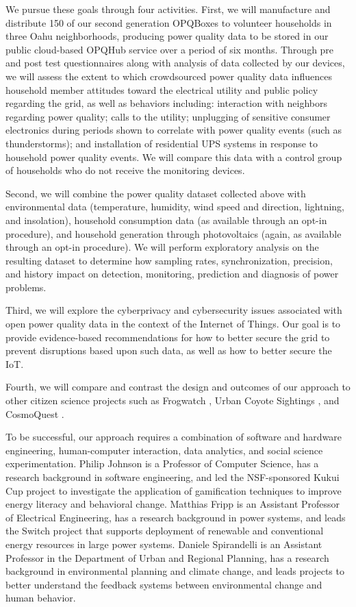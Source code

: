 We pursue these goals through four activities. First, we will manufacture and distribute 150 of our second generation OPQBoxes to volunteer households in three Oahu neighborhoods, producing power quality data to be stored in our public cloud-based OPQHub service over a period of six months. Through pre and post test questionnaires along with analysis of data collected by our devices, we will assess the extent to which crowdsourced power quality data influences household member attitudes toward the electrical utility and public policy regarding the grid, as well as behaviors including: interaction with neighbors regarding power quality; calls to the utility; unplugging of sensitive consumer electronics during periods shown to correlate with power quality events (such as thunderstorms); and installation of residential UPS systems in response to household power quality events.  We will compare this data with a control group of households who do not receive the monitoring devices. 

Second, we will combine the power quality dataset collected above with environmental data (temperature, humidity, wind speed and direction, lightning, and insolation), household consumption data (as available through an opt-in procedure), and household generation through photovoltaics (again, as available through an opt-in procedure).  We will perform exploratory analysis on the resulting dataset to determine how sampling rates, synchronization, precision, and history impact on detection, monitoring, prediction and diagnosis of power problems.

Third, we will explore the cyberprivacy and cybersecurity issues associated with open power quality data in the context of the Internet of Things.  Our goal is to provide evidence-based recommendations for how to better secure the grid to prevent disruptions based upon such data, as well as how to better secure the IoT.

Fourth, we will compare and contrast the design and outcomes of our approach to other citizen science projects such as Frogwatch \cite{frogwatch}, Urban Coyote Sightings \cite{urbancoyote}, and CosmoQuest \cite{cosmoquest}.

To be successful, our approach requires a combination of software and hardware engineering, human-computer interaction, data analytics, and social science experimentation.  Philip Johnson is a Professor of Computer Science, has a research background in software engineering, and led the NSF-sponsored Kukui Cup project \cite{kukuicup} to investigate the application of gamification techniques to improve energy literacy and behavioral change. Matthias Fripp is an Assistant Professor of Electrical Engineering, has a research background in power systems, and leads the Switch project \cite{switch} that supports deployment of renewable and conventional energy resources in large power systems. Daniele Spirandelli is an Assistant Professor in the Department of Urban and Regional Planning, has a research background in environmental planning and climate change, and leads projects to better understand the feedback systems between environmental change and human behavior. 

